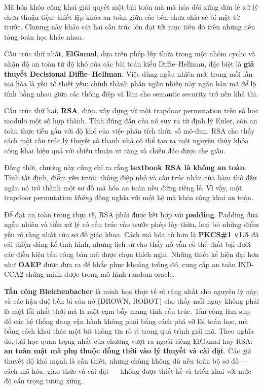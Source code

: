 Mã hóa khóa công khai giải quyết một bài toán mà mã hóa đối xứng đơn lẻ xử lý chưa thuận tiện: thiết lập khóa an toàn giữa các bên chưa chia sẻ bí mật từ trước. Chương này khảo sát hai cấu trúc lớn đạt tới mục tiêu đó trên những nền tảng toán học khác nhau.

Cấu trúc thứ nhất, \textbf{ElGamal}, dựa trên phép lũy thừa trong một nhóm cyclic và nhận độ an toàn từ độ khó của các bài toán kiểu Diffie--Hellman, đặc biệt là \textbf{giả thuyết Decisional Diffie--Hellman}. Việc dùng ngẫu nhiên mới trong mỗi lần mã hóa là yếu tố thiết yếu: chính thành phần ngẫu nhiên này ngăn bản mã để lộ tính bằng nhau giữa các thông điệp và làm cho semantic security trở nên khả thi.

Cấu trúc thứ hai, \textbf{RSA}, được xây dựng từ một trapdoor permutation trên số học modulo một số hợp thành. Tính đúng đắn của nó suy ra từ định lý Euler, còn an toàn thực tiễn gắn với độ khó của việc phân tích thừa số mô-đun. RSA cho thấy cách một cấu trúc lý thuyết số thanh nhã có thể tạo ra một nguyên thủy khóa công khai hiệu quả với chiều thuận rõ ràng và chiều đảo được che giấu.

Đồng thời, chương này cũng chỉ ra rằng \textbf{textbook RSA là không an toàn}. Tính tất định, điểm yếu trước thông điệp nhỏ và cấu trúc nhân của hàm thô đều ngăn nó trở thành một sơ đồ mã hóa an toàn nếu đứng riêng lẻ. Vì vậy, một trapdoor permutation \emph{không} đồng nghĩa với một hệ mã khóa công khai an toàn.

Để đạt an toàn trong thực tế, RSA phải được kết hợp với \textbf{padding}. Padding đưa ngẫu nhiên và tiền xử lý có cấu trúc vào trước phép lũy thừa, loại bỏ những điểm yếu rõ ràng nhất của sơ đồ giáo khoa. Cách mã hóa cũ hơn là \textbf{PKCS\#1 v1.5} đã cải thiện đáng kể tình hình, nhưng lịch sử cho thấy nó vẫn có thể thất bại dưới các điều kiện tấn công bản mã được chọn thích nghi. Những thiết kế hiện đại hơn như \textbf{OAEP} được đưa ra để khắc phục khoảng trống đó, cung cấp an toàn IND-CCA2 chứng minh được trong mô hình random oracle.

\textbf{Tấn công Bleichenbacher} là minh họa thực tế rõ ràng nhất cho nguyên lý này, và các hậu duệ bền bỉ của nó (DROWN, ROBOT) cho thấy mối nguy không phải là một lỗi nhất thời mà là một cạm bẫy mang tính cấu trúc. Tấn công làm sụp đổ các hệ thống đang vận hành không phải bằng cách phá vỡ lõi toán học, mà bằng cách khai thác một bit thông tin rò rỉ trong quá trình giải mã. Theo nghĩa đó, bài học quan trọng nhất của chương vượt ra ngoài riêng ElGamal hay RSA: \textbf{an toàn mật mã phụ thuộc đồng thời vào lý thuyết và cài đặt}. Các giả thuyết độ khó mạnh là cần thiết, nhưng chúng không đủ nếu toàn bộ sơ đồ --- cách mã hóa, giao thức và cài đặt --- không được thiết kế và triển khai với mức độ cẩn trọng tương xứng.
